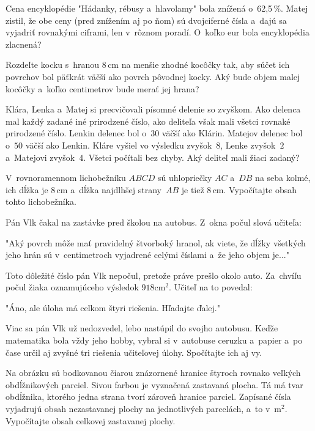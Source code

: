 {%
Cena encyklopédie "Hádanky, rébusy a~hlavolamy" bola znížená o~62,5\,\%. Matej zistil, že obe
ceny (pred znížením aj po ňom) sú dvojciferné čísla a~dajú sa vyjadriť
rovnakými ciframi, len v~rôznom poradí.
O~koľko eur bola encyklopédia zlacnená?}

{%
Rozdeľte kocku s~hranou 8\,cm na menšie zhodné kocôčky tak, aby súčet
ich povrchov bol päťkrát väčší ako povrch pôvodnej kocky.
Aký bude objem malej kocôčky a~koľko centimetrov bude merať jej hrana?}

{%
Klára, Lenka a~Matej si precvičovali písomné delenie so zvyškom. Ako delenca
mal každý zadané iné prirodzené číslo, ako deliteľa však mali všetci
rovnaké prirodzené číslo. Lenkin delenec bol o~$30$ väčší ako Klárin. Matejov
delenec bol o~$50$ väčší ako Lenkin. Kláre vyšiel vo výsledku zvyšok~$8$, Lenke
zvyšok~$2$ a~Matejovi zvyšok~$4$. Všetci počítali bez chyby. Aký deliteľ mali
žiaci zadaný?}

{%
V~rovnoramennom lichobežníku $ABCD$ sú uhlopriečky $AC$ a~$DB$ na seba kolmé, ich
dĺžka je 8\,cm a~dĺžka najdlhšej strany~$AB$ je tiež 8\,cm.
Vypočítajte obsah tohto lichobežníka.}

{%
Pán Vlk čakal na zastávke pred školou na autobus.
Z~okna počul slová učiteľa:

"Aký povrch môže mať %
pravidelný štvorboký hranol, ak viete, že
dĺžky všetkých jeho hrán sú v~centimetroch vyjadrené celými číslami a~že jeho
objem je..."

Toto dôležité číslo pán Vlk nepočul, pretože práve prešlo
okolo auto. Za~chvíľu počul žiaka oznamujúceho výsledok $918\text{cm}^2$.
Učiteľ na to povedal:

"Áno, ale úloha má celkom štyri riešenia. Hľadajte ďalej."

Viac sa pán Vlk už nedozvedel, lebo nastúpil do svojho autobusu.
Keďže matematika bola vždy jeho hobby, vybral si v~autobuse ceruzku a~papier
a~po čase určil aj zvyšné tri riešenia učiteľovej úlohy. Spočítajte ich aj vy.}

{%
Na obrázku sú bodkovanou čiarou znázornené hranice štyroch rovnako veľkých
obdĺžnikových parciel. Sivou farbou je vyznačená zastavaná plocha. Tá má tvar
obdĺžnika, ktorého jedna strana tvorí zároveň hranice parciel. Zapísané čísla
vyjadrujú obsah nezastavanej plochy na jednotlivých parcelách, a~to v~$\text{m}^2$.
Vypočítajte obsah celkovej zastavanej plochy.
%
}

